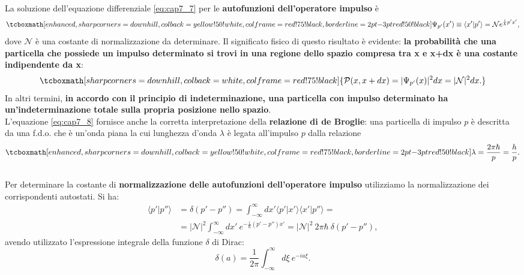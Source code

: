 La soluzione dell'equazione differenziale \eqref{eq:cap7_7} per le \textbf{autofunzioni dell'operatore impulso} è
	\begin{equation}
		\label{eq:cap7_8}
		\tcboxmath[enhanced,sharp corners=downhill ,colback=yellow!50!white,colframe=red!75!black, borderline={2pt}{-3pt}{red!50!black}]{
			\Psi_{p'}(x') \equiv \langle x' | p' \rangle = \mathcal{N} e^{\frac{i}{\hbar}p'x'},
			}
	\end{equation}
dove $\mathcal{N}$ è una costante di normalizzazione da determinare. Il significato fisico di questo risultato è evidente: \textbf{la probabilità che una particella che possiede un impulso determinato si trovi in una regione dello spazio compresa tra x e x+dx è una costante indipendente da x}:
	\begin{equation}
		\tcboxmath[sharp corners=downhill ,colback=white,colframe=red!75!black]{
			\mathcal{P}(x,x+dx) = |\Psi_{p'}(x)|^2 dx = |\mathcal{N}|^2 dx.
			}
	\end{equation}
\noindent In altri termini, \textbf{in accordo con il principio di indeterminazione, una particella con impulso determinato ha un'indeterminazione totale sulla propria posizione nello spazio}.\\

L'equazione \eqref{eq:cap7_8} fornisce anche la corretta interpretazione della \textbf{relazione di de Broglie}: una particella di impulso $p$ è descritta da una f.d.o. che è un'onda piana la cui lunghezza d'onda $\lambda$ è legata all'impulso $p$ dalla relazione
	\begin{equation}
		\tcboxmath[enhanced,sharp corners=downhill ,colback=yellow!50!white,colframe=red!75!black, borderline={2pt}{-3pt}{red!50!black}]{
			\lambda = \frac{2 \pi \hbar}{p} = \frac{h}{p}.
			}
	\end{equation}\\
	
Per determinare la costante di \textbf{normalizzazione delle autofunzioni dell'operatore impulso} utilizziamo la normalizzazione dei corrispondenti autostati. Si ha:
	\begin{align}
		\langle p'\vert p'' \rangle &= \delta \left( p' -p''\right) =\int _{-\infty}	 ^{\infty} dx' \langle p' \vert x' \rangle \langle x' \vert p'' \rangle = \nonumber \\
		&= \vert\mathcal{N} \vert ^2 \int _{-\infty}	 ^{\infty} dx' \ e^{-\frac{i}{\hbar} \left( p'-p''\right) x'} = \vert\mathcal{N} \vert ^2\ 2 \pi \hbar\ \delta\left(p' -p'' \right),
	\end{align}
avendo utilizzato l'espressione integrale della funzione $\delta$ di Dirac:
	\begin{equation}
		\delta \left( a \right) =\frac{1}{2\pi}\int _{-\infty} ^{\infty} d\xi \ e^{-ia\xi}.
	\end{equation}\\

